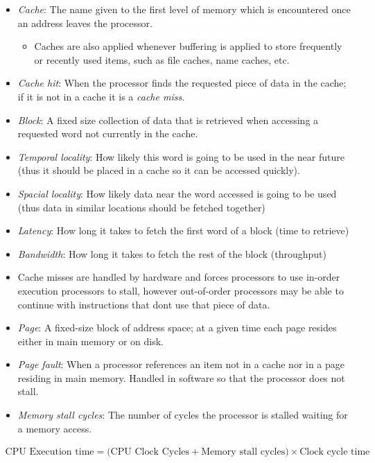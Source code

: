 \documentclass[11pt, a4paper]{article}
\theoremstyle{definition}
\theoremstyle{remark}
\begin{document}
\begin{itemize}
  \item \textit{Cache}: The name given to the first level of memory which is encountered once an address leaves the processor. 
  \begin{itemize}
    \item Caches are also applied whenever buffering is applied to store frequently or recently used items, such as file caches, name caches, etc.
  \end{itemize}
  \item \textit{Cache hit}: When the processor finds the requested piece of data in the cache; if it is not in a cache it is a \textit{cache miss}.
  \item \textit{Block}: A fixed size collection of data that is retrieved when accessing a requested word not currently in the cache.
  \item \textit{Temporal locality}: How likely this word is going to be used in the near future (thus it should be placed in a cache so it can be accessed quickly).
  \item \textit{Spacial locality}: How likely data near the word accessed is going to be used (thus data in similar locations should be fetched together)
  \item \textit{Latency}: How long it takes to fetch the first word of a block (time to retrieve)
  \item \textit{Bandwidth}: How long it takes to fetch the rest of the block (throughput)
  \item Cache misses are handled by hardware and forces processors to use in-order execution processors to stall, however out-of-order processors may be able to continue with instructions that dont use that piece of data.
  \item \textit{Page}: A fixed-size block of address space; at a given time each page resides either in main memory or on disk. 
  \item \textit{Page fault}: When a processor references an item not in a cache nor in a page residing in main memory. Handled in software so that the processor does not stall.
  \item \textit{Memory stall cycles}: The number of cycles the processor is stalled waiting for a memory access.
\end{itemize}
\begin{align*}
  \text{CPU Execution time} = \text{(CPU Clock Cycles} + \text{Memory stall cycles)} \times \text{Clock cycle time}
\end{align*}
\end{document}
